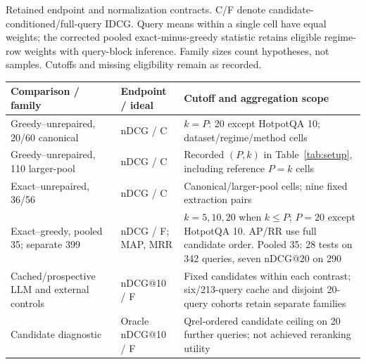 \begin{supplementtable}
\caption{Retained endpoint and normalization contracts. C/F denote candidate-conditioned/full-query IDCG. Query means within a single cell have equal weights; the corrected pooled exact-minus-greedy statistic retains eligible regime-row weights with query-block inference. Family sizes count hypotheses, not samples. Cutoffs and missing eligibility remain as recorded.}
\label{tab:endpoint-contracts}\papertable
\begin{tabularx}{\linewidth}{@{}L{3.0cm}L{2.3cm}Y@{}}\toprule
Comparison / family & Endpoint / ideal & Cutoff and aggregation scope \\\midrule
Greedy--unrepaired, 20/60 canonical & nDCG / C & $k=P$: 20 except HotpotQA 10; dataset/regime/method cells \\\addlinespace
Greedy--unrepaired, 110 larger-pool & nDCG / C & Recorded $(P,k)$ in Table~\ref{tab:setup}, including reference $P=k$ cells \\\addlinespace
Exact--unrepaired, 36/56 & nDCG / C & Canonical/larger-pool cells; nine fixed extraction pairs \\\addlinespace
Exact--greedy, pooled 35; separate 399 & nDCG / F; MAP, MRR & $k=5,10,20$ when $k\le P$; $P=20$ except HotpotQA 10. AP/RR use full candidate order. Pooled 35: 28 tests on 342 queries, seven nDCG@20 on 290 \\\addlinespace
Cached/prospective LLM and external controls & nDCG@10 / F & Fixed candidates within each contrast; six/213-query cache and disjoint 20-query cohorts retain separate families \\\addlinespace
Candidate diagnostic & Oracle nDCG@10 / F & Qrel-ordered candidate ceiling on 20 further queries; not achieved reranking utility \\\bottomrule
\end{tabularx}\end{supplementtable}
